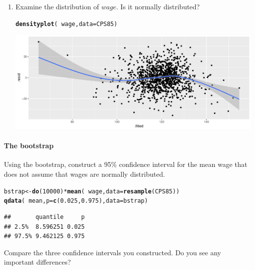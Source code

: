 \documentclass[10pt]{article}\usepackage[]{graphicx}\usepackage[]{color}
\makeatletter
\def\maxwidth{ %
  \ifdim\Gin@nat@width>\linewidth
    \linewidth
  \else
    \Gin@nat@width
  \fi
}
\newcommand{\hlnum}[1]{\textcolor[rgb]{0.686,0.059,0.569}{#1}}%
\newcommand{\hlopt}[1]{\textcolor[rgb]{0,0,0}{#1}}%
\newcommand{\hlstd}[1]{\textcolor[rgb]{0.345,0.345,0.345}{#1}}%
\newcommand{\hlkwb}[1]{\textcolor[rgb]{0.69,0.353,0.396}{#1}}%
\newcommand{\hlkwc}[1]{\textcolor[rgb]{0.333,0.667,0.333}{#1}}%
\newcommand{\hlkwd}[1]{\textcolor[rgb]{0.737,0.353,0.396}{\textbf{#1}}}%
\newenvironment{kframe}{%
 \def\at@end@of@kframe{}%
 \ifinner\ifhmode%
  \def\at@end@of@kframe{\end{minipage}}%
  \begin{minipage}{\columnwidth}%
 \fi\fi%
 \def\FrameCommand##1{\hskip\@totalleftmargin \hskip-\fboxsep
 \colorbox{shadecolor}{##1}\hskip-\fboxsep
     \hskip-\linewidth \hskip-\@totalleftmargin \hskip\columnwidth}%
 \MakeFramed {\advance\hsize-\width
   \@totalleftmargin\z@ \linewidth\hsize
   \@setminipage}}%
 {\par\unskip\endMakeFramed%
 \at@end@of@kframe}
\newenvironment{knitrout}{}{} %
\makeatother
\begin{document}
\begin{enumerate}
  \item Examine the distribution of $wage$. Is it normally distributed? 
\begin{knitrout}\footnotesize
{}\color{fgcolor}\begin{kframe}
\begin{alltt}
\hlkwd{densityplot}\hlstd{(}\hlopt{~}\hlstd{wage,} \hlkwc{data}\hlstd{=CPS85)}
\end{alltt}
\end{kframe}
\includegraphics[width=\maxwidth]{figure/unnamed-chunk-5-1} 

\end{knitrout}
\end{enumerate}

\paragraph{The bootstrap} Using the bootstrap, construct a 95\% confidence interval for the mean wage that does not assume that wages are normally distributed.
\begin{knitrout}\footnotesize
{}\color{fgcolor}\begin{kframe}
\begin{alltt}
\hlstd{bstrap} \hlkwb{<-} \hlkwd{do}\hlstd{(}\hlnum{10000}\hlstd{)} \hlopt{*} \hlkwd{mean}\hlstd{(}\hlopt{~}\hlstd{wage,} \hlkwc{data} \hlstd{=} \hlkwd{resample}\hlstd{(CPS85))}
\hlkwd{qdata}\hlstd{(}\hlopt{~}\hlstd{mean,} \hlkwc{p} \hlstd{=} \hlkwd{c}\hlstd{(}\hlnum{0.025}\hlstd{,} \hlnum{0.975}\hlstd{),} \hlkwc{data} \hlstd{= bstrap)}
\end{alltt}
\begin{verbatim}
##       quantile     p
## 2.5%  8.596251 0.025
## 97.5% 9.462125 0.975
\end{verbatim}
\end{kframe}
\end{knitrout}
Compare the three confidence intervals you constructed. Do you see any important differences?
  
\end{document}
